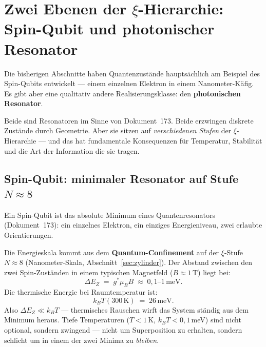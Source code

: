 \section{Zwei Ebenen der \texorpdfstring{$\xi$}{xi}-Hierarchie:
  Spin-Qubit und photonischer Resonator}
\label{sec:zwei-ebenen}

Die bisherigen Abschnitte haben Quantenzustände
hauptsächlich am Beispiel des Spin-Qubits entwickelt ---
einem einzelnen Elektron in einem Nanometer-Käfig.
Es gibt aber eine qualitativ andere Realisierungsklasse:
den \textbf{photonischen Resonator}.

Beide sind Resonatoren im Sinne von Dokument~173.
Beide erzwingen diskrete Zustände durch Geometrie.
Aber sie sitzen auf \emph{verschiedenen Stufen}
der $\xi$-Hierarchie --- und das hat fundamentale
Konsequenzen für Temperatur, Stabilität und
die Art der Information die sie tragen.

\subsection{Spin-Qubit: minimaler Resonator auf Stufe \texorpdfstring{$N \approx 8$}{N≈8}}

Ein Spin-Qubit ist das absolute Minimum eines
Quantenresonators (Dokument~173):
ein einzelnes Elektron, ein einziges Energieniveau,
zwei erlaubte Orientierungen.

Die Energieskala kommt aus dem
\textbf{Quantum-Confinement} auf der $\xi$-Stufe $N \approx 8$
(Nanometer-Skala, Abschnitt~\ref{sec:zylinder}).
Der Abstand zwischen den zwei Spin-Zuständen
in einem typischen Magnetfeld ($B \approx 1$\,T)
liegt bei:
\begin{equation}
  \Delta E_Z \;=\; g^* \mu_B B \;\approx\; 0{,}1\text{--}1\,\text{meV}.
\end{equation}
Die thermische Energie bei Raumtemperatur ist:
\begin{equation}
  k_B T(300\,\text{K}) \;=\; 26\,\text{meV}.
\end{equation}
Also $\Delta E_Z \ll k_BT$ --- thermisches Rauschen
wirft das System ständig aus dem Minimum heraus.
Tiefe Temperaturen ($T < 1$\,K, $k_BT < 0{,}1$\,meV)
sind nicht optional, sondern zwingend ---
nicht um Superposition zu erhalten,
sondern schlicht um in einem der zwei Minima
zu \emph{bleiben}.

